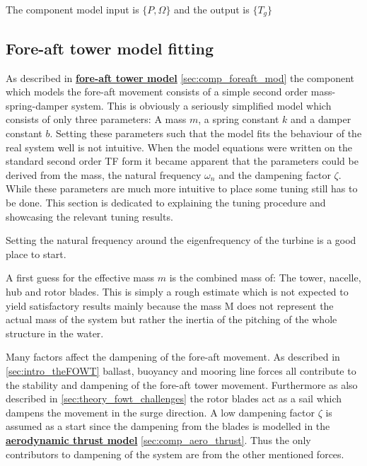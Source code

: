 The component model input is $ \{P, \Omega\} $ and the output is $ \{T_g\} $



\subsection{Fore-aft tower model fitting} \label{sec:app_mod_foreaft_fitting}
As described in \hyperref[sec:comp_foreaft_mod]{\textbf{fore-aft tower model}} \cref{sec:comp_foreaft_mod} the component which models the fore-aft movement consists of a simple second order mass-spring-damper system. This is obviously a seriously simplified model which consists of only three parameters: A mass $ m $, a spring constant $ k $ and a damper constant $ b $. Setting these parameters such that the model fits the behaviour of the real system well is not intuitive. When the model equations were written on the standard second order TF form it became apparent that the parameters could be derived from the mass, the natural frequency $ \omega_n $ and the dampening factor $ \zeta $. While these parameters are much more intuitive to place some tuning still has to be done. This section is dedicated to explaining the tuning procedure and showcasing the relevant tuning results.

\medskip

\noindent Setting the natural frequency around the eigenfrequency of the turbine is a good place to start.

\smallskip
\noindent A first guess for the effective mass $ m $ is the combined mass of: The tower, nacelle, hub and rotor blades. This is simply a rough estimate which is not expected to yield satisfactory results mainly because the mass M does not represent the actual mass of the system but rather the inertia of the pitching of the whole structure in the water. 

\smallskip
\noindent Many factors affect the dampening of the fore-aft movement. As described in \cref{sec:intro_theFOWT} ballast, buoyancy and mooring line forces all contribute to the stability and dampening of the fore-aft tower movement. Furthermore as also described in \cref{sec:theory_fowt_challenges} the rotor blades act as a sail which dampens the movement in the surge direction. A low dampening factor $ \zeta $ is assumed as a start since the dampening from the blades is modelled in the \hyperref[sec:comp_aero_thrust]{\textbf{aerodynamic thrust model}} \cref{sec:comp_aero_thrust}. Thus the only contributors to dampening of the system are from the other mentioned forces.


